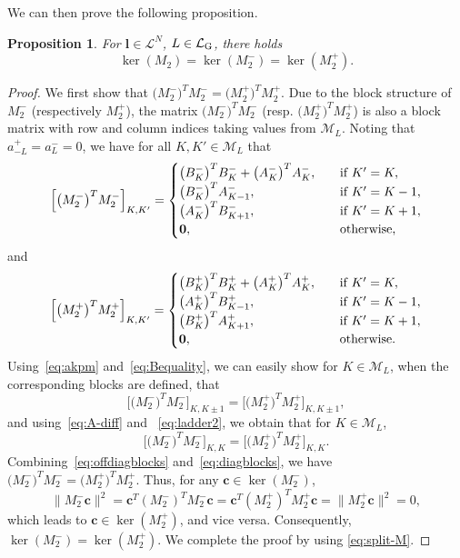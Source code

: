\documentclass{article}
\newtheorem{proposition}[theorem]{Proposition}
\numberwithin{equation}{section}
\def\bc{{\bm c}}
\def\bl{{\bm l}}
\def\calM{\mathcal{M}}
\def\calL{\mathcal{L}}
\def\calLG{\mathcal{\calL_{\rm G}}}
\def\MlL{{M}}
\def\Mp{M^{+}}
\def\Mm{M^{-}}
\def\Ap{A^{+}}
\def\Am{A^{-}}
\def\Bp{B^{+}}
\def\Bm{B^{-}}
\begin{document}
We can then prove the following proposition.
\begin{proposition}\label{prop:matrix_final}
    For $\bl\in \calL^N$, $L\in \calLG$, there holds
    \[
        \ker(\MlL_{2}) = \ker(\Mm_{2}) = \ker(\Mp_{2}).
    \]
\end{proposition}
\begin{proof}
We first show that $\big(\Mm_{2}\big)^T\Mm_{2} = 
    \big(\Mp_{2}\big)^T\Mp_{2}.$
Due to the block structure of $\Mm_{2}$ (respectively $\Mp_{2}$), the matrix $\big(\Mm_{2}\big)^T\Mm_{2}$ (resp. $\big(\Mp_{2}\big)^T\Mp_{2}$) is also a block matrix with row and column indices taking values from $\calM_L$. Noting that 
$a^+_{-L} = a^-_{L} =0$, 
we have for all $K,K'\in\calM_L$ that
\[
    \Big[\big(\Mm_{2}\big)^T\Mm_{2}\Big]_{K,K'} = 
    \begin{cases}
        \big(\Bm_K\big)^T\Bm_K + \big(\Am_K\big)^T\Am_K, \quad & \textup{if } K'=K, \\
        \big(\Bm_{K}\big)^T\Am_{K-1}, \quad & \textup{if } K'=K-1, \\
        \big(\Am_{K}\big)^T\Bm_{K+1}, \quad & \textup{if } K'=K+1, \\
        \mathbf{0}, \quad & \textup{otherwise,}
    \end{cases}
\]
and 
\[
    \Big[\big(\Mp_{2}\big)^T\Mp_{2}\Big]_{K,K'} = 
    \begin{cases}
        \big(\Bp_K\big)^T\Bp_K + \big(\Ap_K\big)^T\Ap_K, \quad & \textup{if } K'=K, \\
        \big(\Ap_{K}\big)^T\Bp_{K-1}, \quad & \textup{if } K'=K-1, \\
        \big(\Bp_{K}\big)^T\Ap_{K+1}, \quad & \textup{if } K'=K+1, \\
        \mathbf{0}, \quad & \textup{otherwise.}
    \end{cases}
\]
Using~\eqref{eq:akpm} and~\eqref{eq:Bequality}, we can easily show for $K\in \calM_L$, when the corresponding blocks are defined, that
\begin{equation}
    \Big[\big(\Mm_{2}\big)^T\Mm_{2}\Big]_{K,K\pm 1} 
= 
\Big[\big(\Mp_{2}\big)^T\Mp_{2}\Big]_{K,K \pm 1},
\label{eq:offdiagblocks}
\end{equation}
and using~\eqref{eq:A-diff} and ~\eqref{eq:ladder2}, we obtain that for $K\in\calM_L$,
\begin{equation}
    \Big[\big(\Mm_{2}\big)^T\Mm_{2}\Big]_{K,K} 
= 
\Big[\big(\Mp_{2}\big)^T\Mp_{2}\Big]_{K,K }.
\label{eq:diagblocks}
\end{equation}
Combining~\eqref{eq:offdiagblocks} and~\eqref{eq:diagblocks}, we have
$\big(\Mm_{2}\big)^T\Mm_{2} = 
    \big(\Mp_{2}\big)^T\Mp_{2}.$
Thus, for any $\bc\in\ker(\Mm_{2})$,
\[
    \|\Mm_{2}\bc\|^2 = \bc^T(\Mm_{2})^T\Mm_{2}\bc=\bc^T(\Mp_{2})^T\Mp_{2}\bc=\|\Mp_{2}\bc\|^2=0,
\]
which leads to $\bc\in\ker(\Mp_{2})$, and vice versa. Consequently, $\ker(\Mm_{2})=\ker(\Mp_{2})$. We complete the proof by using \eqref{eq:split-M}.
\end{proof}
\end{document}

